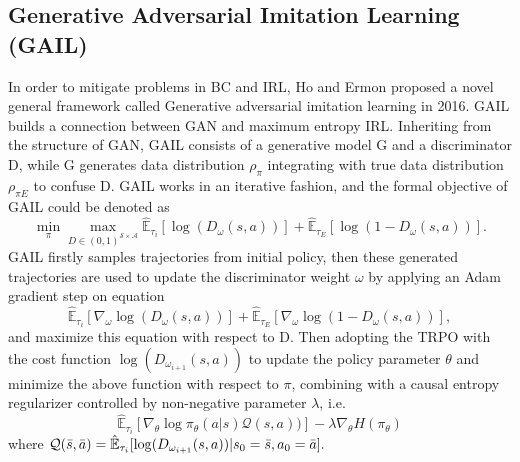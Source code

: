 \documentclass[acmsmall]{acmart}
\begin{document}
\subsection{Generative Adversarial Imitation Learning (GAIL)}
In order to mitigate problems in BC and IRL, Ho and Ermon\cite{hoGenerativeAdversarialImitation2016} proposed a novel general framework called Generative adversarial imitation learning in 2016. GAIL builds a connection between GAN\cite{goodfellow2014generative} and maximum entropy IRL\cite{ziebart2008maximum}. Inheriting from the structure of GAN, GAIL consists of a generative model G and a discriminator D, while G generates data distribution $\rho_\pi$ integrating with true data distribution $\rho_{\pi E}$ to confuse D. GAIL works in an iterative fashion, and the formal objective of GAIL could be denoted as 
\[
\min_{\pi}\max_{D\in(0,1)^{\mathcal{S}\times\mathcal{A}}}\hat{\mathbb{E}}_{\tau_i}[\log(D_{\omega}(s,a))]+\hat{\mathbb{E}}_{\tau_E}[\log(1-D_{\omega}(s,a))].
\]
GAIL firstly samples trajectories from initial policy, then these generated trajectories are used to update the discriminator weight $\omega$ by applying an Adam gradient step on equation
\[
\hat{\mathbb{E}}_{\tau_i}[\nabla_{\omega}\log(D_{\omega}(s,a))]+\hat{\mathbb{E}}_{\tau_E}[\nabla_{\omega}\log(1-D_{\omega}(s,a))],
\]
and maximize this equation with respect to D.
Then adopting the TRPO\cite{schulmanTrustRegionPolicy2017} with the cost function $\log(D_{\omega_{i+1}}(s,a))$ to update the policy parameter $\theta$ and minimize the above function with respect to $\pi$, combining with a causal entropy regularizer controlled by non-negative parameter $\lambda$, i.e. 
\[
\hat{\mathbb{E}}_{\tau_i}[\nabla_{\theta}\log\pi_{\theta}(a|s)\mathcal{Q}(s,a))]-\lambda\nabla_{\theta}H(\pi_\theta)
\]
\noindent 
where $\mathcal{Q}(\Bar{s},\Bar{a})=\hat{\mathbb{E}}_{\tau_i}[\log(D_{\omega_{i+1}}(s,a))|s_0 = \Bar{s},a_0 = \Bar{a}].$
\end{document}
